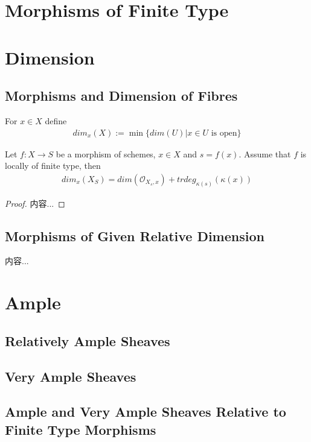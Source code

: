 \documentclass[Total.tex]{subfiles}
\begin{document}
		\section{Morphisms of Finite Type}
		\section{Dimension}
		\subsection{Morphisms and Dimension of Fibres}
			\begin{Def}
				 For $x\in X$ define
				 \begin{gather*}
				 	dim_x(X):=\min\{dim(U)|x\in U\mbox{ is open}\}
				 \end{gather*}
			\end{Def}
			
			\begin{lemma}
				Let $f:X\rightarrow S$ be a morphism of schemes, $x\in X$ and $s=f(x)$. Assume that $f$ is locally of finite type, then
				\begin{gather*}
					dim_x(X_S)=dim(\mathcal{O}_{X_s,x})+trdeg_{\kappa(s)}(\kappa(x))
				\end{gather*}
			\end{lemma}
			\begin{proof}
				内容...
			\end{proof}
		\subsection{Morphisms of Given Relative Dimension}
			\begin{Def}
				内容...
			\end{Def}
		\section{Ample}
			\subsection{Relatively Ample Sheaves}
			\subsection{Very Ample Sheaves}
			\subsection{Ample and Very Ample Sheaves Relative to Finite Type Morphisms}
\end{document}
